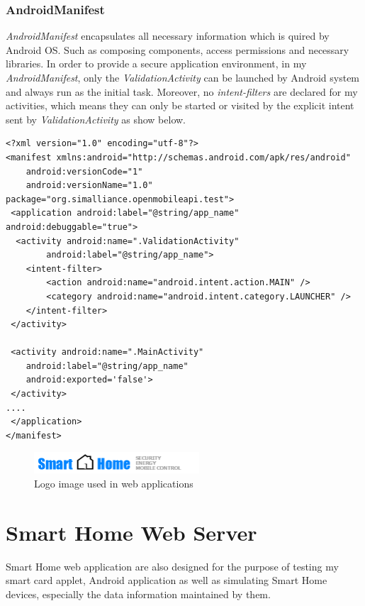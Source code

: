 \subsubsection{AndroidManifest}
\emph{AndroidManifest} encapsulates all necessary information which is quired by Android OS. Such as composing components, access permissions and necessary libraries\cite{android_manifest}. In order to provide a secure application environment, in my \emph{AndroidManifest}, only the \emph{ValidationActivity} can be launched by Android system and always run as the initial task. Moreover, no \emph{intent-filters} are declared for my activities, which means they can only be started or visited by the explicit intent sent by \emph{ValidationActivity} as show below.
\begin{Verbatim}[fontsize=\relsize{-1},frame=lines,framesep=4mm, label=\fbox{\small\emph{AndroidManifest.xml}}]
<?xml version="1.0" encoding="utf-8"?>
<manifest xmlns:android="http://schemas.android.com/apk/res/android"
	android:versionCode="1"
	android:versionName="1.0" package="org.simalliance.openmobileapi.test">
 <application android:label="@string/app_name" android:debuggable="true">
  <activity android:name=".ValidationActivity"
 		android:label="@string/app_name">
	<intent-filter>
		<action android:name="android.intent.action.MAIN" />
		<category android:name="android.intent.category.LAUNCHER" />
	</intent-filter>
 </activity>
      
 <activity android:name=".MainActivity"
	android:label="@string/app_name"
	android:exported='false'>
 </activity>
....
 </application>
</manifest> 
\end{Verbatim}



\begin{figure}[!htb]
	\centering
	\includegraphics[width=0.55\textwidth]{logo.png}
		\caption{Logo image used in web applications}
	\label{fig:logo}
\end{figure}

\section{Smart Home Web Server}
Smart Home web application are also designed for the purpose of testing my smart card applet, Android application as well as simulating Smart Home devices, especially the data information maintained by them. 

